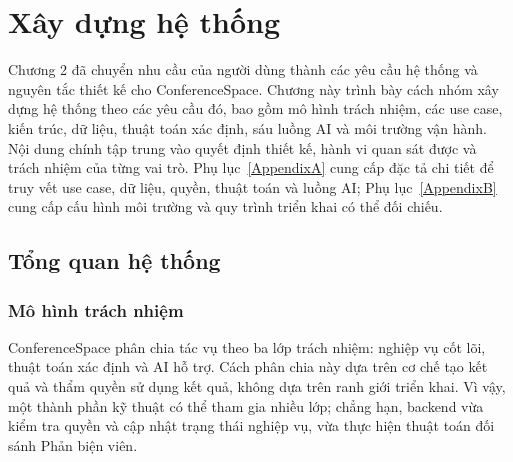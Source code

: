 
\chapter{Xây dựng hệ thống}
\label{ChapterThreeDemo}

Chương 2 đã chuyển nhu cầu của người dùng thành các yêu cầu hệ thống và nguyên tắc thiết kế cho ConferenceSpace. Chương này trình bày cách nhóm xây dựng hệ thống theo các yêu cầu đó, bao gồm mô hình trách nhiệm, các use case, kiến trúc, dữ liệu, thuật toán xác định, sáu luồng AI và môi trường vận hành. Nội dung chính tập trung vào quyết định thiết kế, hành vi quan sát được và trách nhiệm của từng vai trò. Phụ lục~\ref{AppendixA} cung cấp đặc tả chi tiết để truy vết use case, dữ liệu, quyền, thuật toán và luồng AI; Phụ lục~\ref{AppendixB} cung cấp cấu hình môi trường và quy trình triển khai có thể đối chiếu.

\section{Tổng quan hệ thống}
\label{sec:ch3-demo-overview}

\subsection{Mô hình trách nhiệm}

ConferenceSpace phân chia tác vụ theo ba lớp trách nhiệm: nghiệp vụ cốt lõi, thuật toán xác định và AI hỗ trợ. Cách phân chia này dựa trên cơ chế tạo kết quả và thẩm quyền sử dụng kết quả, không dựa trên ranh giới triển khai. Vì vậy, một thành phần kỹ thuật có thể tham gia nhiều lớp; chẳng hạn, backend vừa kiểm tra quyền và cập nhật trạng thái nghiệp vụ, vừa thực hiện thuật toán đối sánh Phản biện viên.

